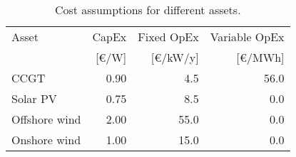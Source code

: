 \begin{table}[h!]
\centering
\caption{Cost assumptions for different assets.}
\label{tab:cost-assumptions}
\begin{tabular}{lrrr}  \toprule
Asset & CapEx & Fixed OpEx & Variable OpEx\\
 & [€/W] & [€/kW/y] & [€/MWh]\\ \midrule
CCGT & 0.90 & 4.5 & 56.0\\
Solar PV & 0.75 & 8.5 & 0.0\\
Offshore wind & 2.00 & 55.0 & 0.0\\
Onshore wind & 1.00 & 15.0 & 0.0\\
 \bottomrule
\end{tabular}
\end{table}
